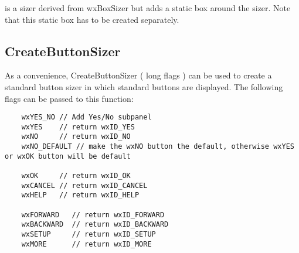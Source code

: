  is a sizer derived from wxBoxSizer but adds a static
box around the sizer. Note that this static box has to be created 
separately.

\subsection{CreateButtonSizer}\label{createbuttonsizer}

As a convenience, CreateButtonSizer ( long flags ) can be used to create a standard button sizer
in which standard buttons are displayed. The following flags can be passed to this function:


\begin{verbatim}
    wxYES_NO // Add Yes/No subpanel
    wxYES    // return wxID_YES
    wxNO     // return wxID_NO
    wxNO_DEFAULT // make the wxNO button the default, otherwise wxYES or wxOK button will be default
    
    wxOK     // return wxID_OK
    wxCANCEL // return wxID_CANCEL
    wxHELP   // return wxID_HELP
    
    wxFORWARD   // return wxID_FORWARD  
    wxBACKWARD  // return wxID_BACKWARD 
    wxSETUP     // return wxID_SETUP    
    wxMORE      // return wxID_MORE     

\end{verbatim}
